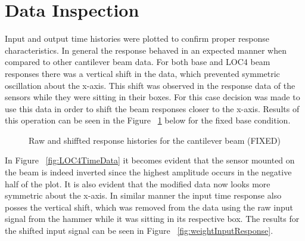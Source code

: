 \documentclass[paper=a4, fontsize=12pt]{scrartcl} %
\begin{document}
\section*{Data Inspection}
Input and output time histories were plotted to confirm proper response characteristics. In general the response behaved in an expected manner when compared to other cantilever beam data. For both base and LOC4 beam responses there was a vertical shift in the data, which prevented symmetric oscillation about the x-axis. This shift was observed in the response data of the sensors while they were sitting in their boxes. For this case decision was made to use this data in order to shift the beam responses closer to the x-axis. Results of this operation can be seen in the Figure ~\ref{fig:weightTimeResponse} below for the fixed base condition.
%
	\begin{figure}[H]
		\centering
		\quad
		\caption{Raw and shiffted response histories for the cantilever beam (FIXED)}
		\label{fig:weightTimeResponse}
	\end{figure}
%
In Figure ~\ref{fig:LOC4TimeData} it becomes evident that the sensor mounted on the beam is indeed inverted since the highest amplitude occurs in the negative half of the plot. It is also evident that the modified data now looks more symmetric about the x-axis. In similar manner the input time response also posses the vertical shift, which was removed from the data using the raw input signal from the hammer while it was sitting in its respective box. The results for the shifted input signal can be seen in Figure ~\ref{fig:weightInputResponse}.
\end{document}
